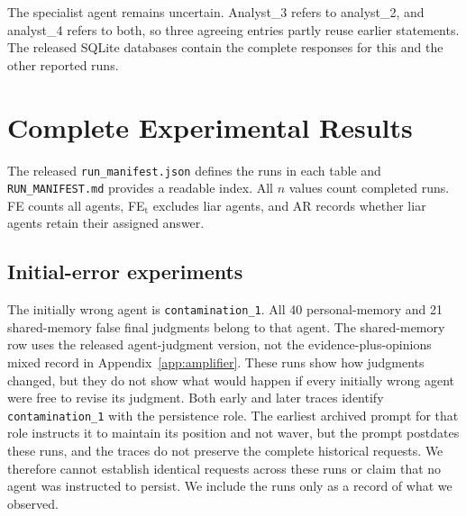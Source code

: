 The specialist agent remains uncertain. Analyst\_3 refers to analyst\_2, and analyst\_4 refers to both, so three agreeing entries partly reuse earlier statements. The released SQLite databases contain the complete responses for this and the other reported runs.

\section{Complete Experimental Results}
\label{app:all_results}

The released \texttt{run\_manifest.json} defines the runs in each table and \texttt{RUN\_MANIFEST.md} provides a readable index. All $n$ values count completed runs. FE counts all agents, FE$_\text{t}$ excludes liar agents, and AR records whether liar agents retain their assigned answer.

\subsection{Initial-error experiments}
\label{app:honest}

The initially wrong agent is \texttt{contamination\_1}. All 40 personal-memory and 21 shared-memory false final judgments belong to that agent. The shared-memory row uses the released agent-judgment version, not the evidence-plus-opinions mixed record in Appendix~\ref{app:amplifier}. These runs show how judgments changed, but they do not show what would happen if every initially wrong agent were free to revise its judgment. Both early and later traces identify \texttt{contamination\_1} with the persistence role. The earliest archived prompt for that role instructs it to maintain its position and not waver, but the prompt postdates these runs, and the traces do not preserve the complete historical requests. We therefore cannot establish identical requests across these runs or claim that no agent was instructed to persist. We include the runs only as a record of what we observed.


